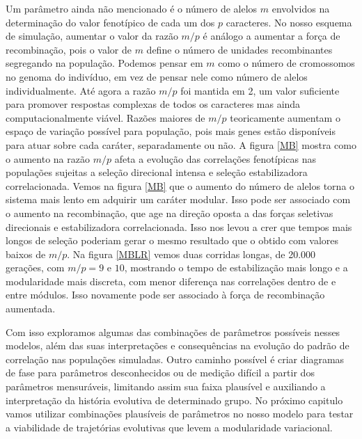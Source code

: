 Um parâmetro ainda não mencionado é o número de alelos $m$ envolvidos na
determinação do valor fenotípico de cada um dos $p$ caracteres. 
No nosso esquema de simulação, aumentar o valor da razão $m/p$ é análogo
a aumentar a força de recombinação, pois o valor de $m$ define o número
de unidades recombinantes segregando na população. 
Podemos pensar em $m$ como o número de cromossomos no genoma do
indivíduo, em vez de pensar nele como número de alelos individualmente. 
Até agora a razão $m/p$ foi mantida em 2, um valor suficiente para
promover respostas complexas de todos os caracteres mas ainda
computacionalmente viável. 
Razões maiores de $m/p$ teoricamente aumentam o espaço de variação
possível para população, pois mais genes estão disponíveis para atuar
sobre cada caráter, separadamente ou não. 
A figura \ref{MB} mostra como o aumento na razão $m/p$ afeta a evolução
das correlações fenotípicas nas populações sujeitas a seleção direcional
intensa e seleção estabilizadora correlacionada. 
Vemos na figura \ref{MB} que o aumento do número de alelos torna o
sistema mais lento em adquirir um caráter modular. 
Isso pode ser associado com o aumento na recombinação, que age na
direção oposta a das forças seletivas direcionais e estabilizadora
correlacionada. 
Isso nos levou a crer que tempos mais longos de seleção poderiam gerar o
mesmo resultado que o obtido com valores baixos de $m/p$. 
Na figura \ref{MBLR} vemos duas corridas longas, de 20.000 gerações, com
$m/p = 9$ e $10$, mostrando o tempo de estabilização mais longo e a
modularidade mais discreta, com menor diferença nas correlações dentro
de e entre módulos. 
Isso novamente pode ser associado à força de recombinação aumentada. 

Com isso exploramos algumas das combinações de parâmetros possíveis
nesses modelos, além das suas interpretações e consequências na evolução
do padrão de correlação nas populações simuladas. 
Outro caminho possível é criar diagramas de fase para parâmetros
desconhecidos ou de medição difícil a partir dos parâmetros mensuráveis, 
limitando assim sua faixa plausível e auxiliando a interpretação da
história evolutiva de determinado grupo. 
No próximo capitulo vamos utilizar combinações plausíveis de parâmetros
no nosso modelo para testar a viabilidade de trajetórias evolutivas que
levem a modularidade variacional. 

